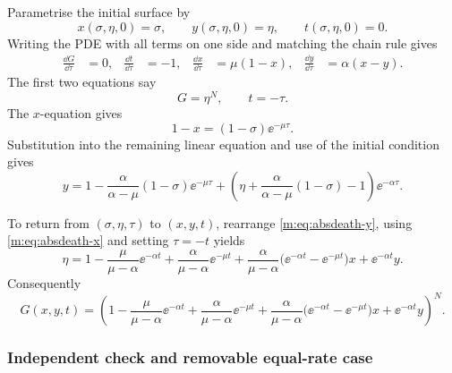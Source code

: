 Parametrise the initial surface by
\[
  x(\sigma,\eta,0)=\sigma,\qquad
  y(\sigma,\eta,0)=\eta,\qquad t(\sigma,\eta,0)=0.
\]
Writing the PDE with all terms on one side and matching the chain rule gives
\begin{align}
  \frac{\dd G}{\dd\tau}&=0,&
  \frac{\dd t}{\dd\tau}&=-1,&
  \frac{\dd x}{\dd\tau}&=\mu(1-x),&
  \frac{\dd y}{\dd\tau}&=\alpha(x-y).
  \label{m:eq:absdeath-characteristics}
\end{align}
The first two equations say
\begin{equation}
  G=\eta^N,\qquad t=-\tau.
  \label{m:eq:absdeath-Gt}
\end{equation}
The $x$-equation gives
\begin{equation}
  1-x=(1-\sigma)\ee^{-\mu\tau}.
  \label{m:eq:absdeath-x}
\end{equation}
Substitution into the remaining linear equation and use of the initial condition
gives
\begin{equation}
  y=1-\frac{\alpha}{\alpha-\mu}(1-\sigma)\ee^{-\mu\tau}
  +\left(\eta+\frac{\alpha}{\alpha-\mu}(1-\sigma)-1\right)
   \ee^{-\alpha\tau}.
  \label{m:eq:absdeath-y}
\end{equation}

To return from $(\sigma,\eta,\tau)$ to $(x,y,t)$, rearrange
\cref{m:eq:absdeath-y}, using \cref{m:eq:absdeath-x} and setting $\tau=-t$
yields
\begin{equation}
  \eta=
  1-\frac{\mu}{\mu-\alpha}\ee^{-\alpha t}
   +\frac{\alpha}{\mu-\alpha}\ee^{-\mu t}
   +\frac{\alpha}{\mu-\alpha}
      \bigl(\ee^{-\alpha t}-\ee^{-\mu t}\bigr)x
   +\ee^{-\alpha t}y.
  \label{m:eq:absdeath-eta}
\end{equation}
Consequently
\begin{equation}
  \boxed{
  G(x,y,t)=\left(
  1-\frac{\mu}{\mu-\alpha}\ee^{-\alpha t}
   +\frac{\alpha}{\mu-\alpha}\ee^{-\mu t}
   +\frac{\alpha}{\mu-\alpha}
      \bigl(\ee^{-\alpha t}-\ee^{-\mu t}\bigr)x
   +\ee^{-\alpha t}y
  \right)^N.}
  \label{m:eq:Gabsdeath}
\end{equation}

\subsubsection*{Independent check and removable equal-rate case}

